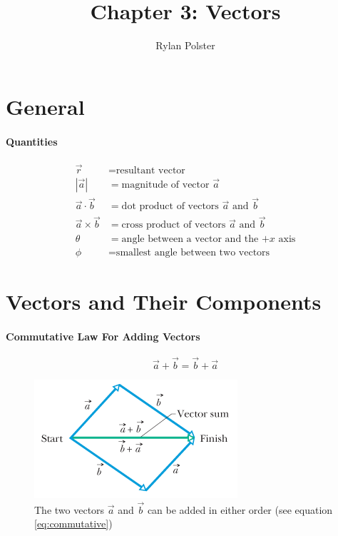 \documentclass{article}
\title{Chapter 3: Vectors}
\author{Rylan Polster}
\begin{document}
    \maketitle
    
    \section*{General}

        \paragraph{Quantities}
        \begin{align}
            \vec{r} &= \text{resultant vector} \nonumber\\
            |\vec{a}| &= \text{magnitude of vector $\vec{a}$} \nonumber\\
            \vec{a} \cdot \vec{b} &= \text{dot product of vectors $\vec{a}$ and $\vec{b}$} \nonumber\\
            \vec{a} \times \vec{b} &= \text{cross product of vectors $\vec{a}$ and $\vec{b}$} \nonumber\\
            \theta &= \text{angle between a vector and the $+x$ axis} \nonumber\\
            \phi &= \text{smallest angle between two vectors} \nonumber
        \end{align}

    \section{Vectors and Their Components}

        \paragraph{Commutative Law For Adding Vectors}
        \begin{equation} \label{eq:commutative}
            \vec{a} + \vec{b} = \vec{b} + \vec{a}
        \end{equation}
        \begin{figure}[H]
            \centering
            \includegraphics[scale=0.6]{commutative}
            \caption{The two vectors $\vec{a}$ and $\vec{b}$ can be added in either order (see equation \ref{eq:commutative})}
        \end{figure}
\end{document}
